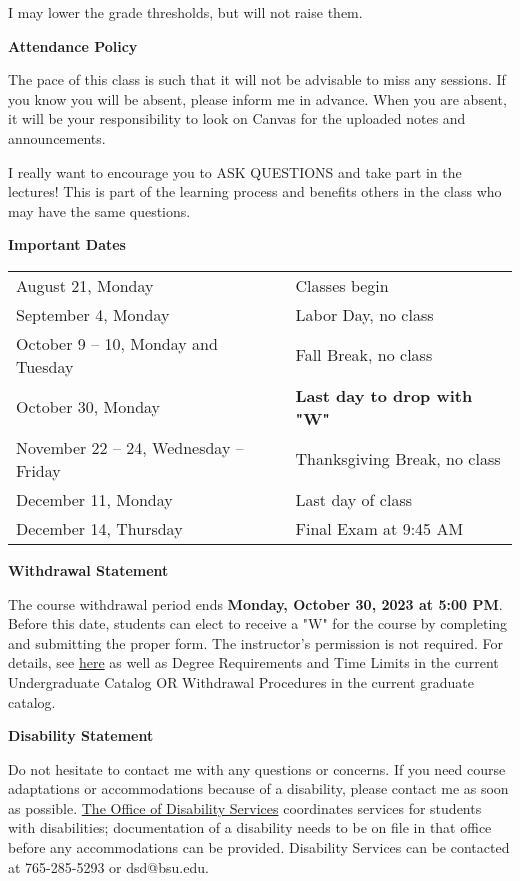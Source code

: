 \documentclass{article}
\begin{document}
I may lower the grade thresholds, but will not raise them.\bigskip

\textbf{\large Attendance Policy}\medskip

The pace of this class is such that it will not be advisable to miss any sessions. If you know you will be absent, please inform me in advance. When you are absent, it will be your responsibility to look on Canvas for the uploaded notes and announcements.

I really want to encourage you to ASK QUESTIONS and take part in the lectures! This is part of the learning process and benefits others in the class who may have the same questions.\bigskip

\newpage

\textbf{\large Important Dates}\medskip

\begin{tabular}{ll}
    August 21, Monday & Classes begin\\
    September 4, Monday & Labor Day, no class\\
    October 9 -- 10, Monday and Tuesday & Fall Break, no class\\
    October 30, Monday & \textbf{Last day to drop with "W"}\\
    November 22 -- 24, Wednesday -- Friday & Thanksgiving Break, no class\\
    December 11, Monday & Last day of class\\
    December 14, Thursday & Final Exam at 9:45 AM
\end{tabular}\bigskip

\textbf{\large Withdrawal Statement}\medskip

The course withdrawal period ends \textbf{Monday, October 30, 2023 at 5:00 PM}. Before this date, students can elect to receive a "W" for the course by completing and submitting the proper form. The instructor's permission is not required. For details, see \href{https://www.bsu.edu/about/administrativeoffices/registrar/registration-activities/withdraw-from-classes}{here} as well as Degree Requirements and Time Limits in the current Undergraduate Catalog OR Withdrawal Procedures in the current graduate catalog.\bigskip

\textbf{\large Disability Statement}\medskip

Do not hesitate to contact me with any questions or concerns. If you need course adaptations or accommodations because of a disability, please contact me as soon as possible. \href{https://www.bsu.edu/about/administrativeoffices/disability-services}{The Office of Disability Services} coordinates services for students with disabilities; documentation of a disability needs to be on file in that office before any accommodations can be provided. Disability Services can be contacted at 765-285-5293 or dsd@bsu.edu.
\end{document}

